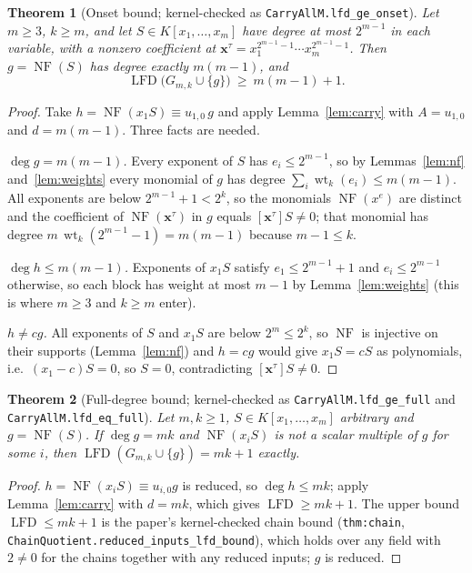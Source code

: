 \documentclass[11pt]{article}
\newcommand{\lfd}{\operatorname{LFD}}
\newcommand{\NF}{\operatorname{NF}}
\newcommand{\wt}{\operatorname{wt}}
\newcommand{\code}[1]{\texttt{#1}}
\newtheorem{theorem}{Theorem}
\theoremstyle{definition}
\theoremstyle{remark}
\begin{document}
\begin{theorem}[Onset bound; kernel-checked as \code{CarryAllM.lfd\_ge\_onset}]\label{thm:onset}
Let $m\ge3$, $k\ge m$, and let $S\in K[x_1,\ldots,x_m]$ have degree at most
$2^{m-1}$ in each variable, with a nonzero coefficient at
$\mathbf x^{\tau}=x_1^{2^{m-1}-1}\cdots x_m^{2^{m-1}-1}$. Then
$g=\NF(S)$ has degree exactly $m(m-1)$, and
\[
 \lfd\bigl(G_{m,k}\cup\{g\}\bigr)\ \ge\ m(m-1)+1 .
\]
\end{theorem}
\begin{proof}
Take $h=\NF(x_1S)\equiv u_{1,0}\,g$ and apply Lemma~\ref{lem:carry} with
$A=u_{1,0}$ and $d=m(m-1)$. Three facts are needed.

\emph{$\deg g=m(m-1)$.} Every exponent of $S$ has $e_i\le2^{m-1}$, so by
Lemmas~\ref{lem:nf} and~\ref{lem:weights} every monomial of $g$ has
degree $\sum_i\wt_k(e_i)\le m(m-1)$. All exponents are below $2^{m-1}+1<2^k$,
so the monomials $\NF(x^e)$ are distinct and the coefficient of
$\NF(\mathbf x^\tau)$ in $g$ equals $[\mathbf x^\tau]S\ne0$; that monomial has
degree $m\,\wt_k(2^{m-1}-1)=m(m-1)$ because $m-1\le k$.

\emph{$\deg h\le m(m-1)$.} Exponents of $x_1S$ satisfy $e_1\le2^{m-1}+1$ and
$e_i\le2^{m-1}$ otherwise, so each block has weight at most $m-1$ by
Lemma~\ref{lem:weights} (this is where $m\ge3$ and $k\ge m$ enter).

\emph{$h\ne cg$.} All exponents of $S$ and $x_1S$ are below $2^m\le2^k$, so
$\NF$ is injective on their supports (Lemma~\ref{lem:nf}) and $h=cg$ would give
$x_1S=cS$ as polynomials, i.e.\ $(x_1-c)S=0$, so $S=0$, contradicting
$[\mathbf x^\tau]S\ne0$.
\end{proof}

\begin{theorem}[Full-degree bound; kernel-checked as \code{CarryAllM.lfd\_ge\_full} and \code{CarryAllM.lfd\_eq\_full}]\label{thm:full}
Let $m,k\ge1$, $S\in K[x_1,\ldots,x_m]$ arbitrary and $g=\NF(S)$. If
$\deg g=mk$ and $\NF(x_iS)$ is not a scalar multiple of $g$ for some $i$,
then $\lfd(G_{m,k}\cup\{g\})=mk+1$ exactly.
\end{theorem}
\begin{proof}
$h=\NF(x_iS)\equiv u_{i,0}g$ is reduced, so $\deg h\le mk$; apply
Lemma~\ref{lem:carry} with $d=mk$, which gives $\lfd\ge mk+1$. The upper
bound $\lfd\le mk+1$ is the paper's kernel-checked chain bound
(\code{thm:chain}, \code{ChainQuotient.reduced\_inputs\_lfd\_bound}), which
holds over any field with $2\ne0$ for the chains together with any reduced
inputs; $g$ is reduced.
\end{proof}
\end{document}
